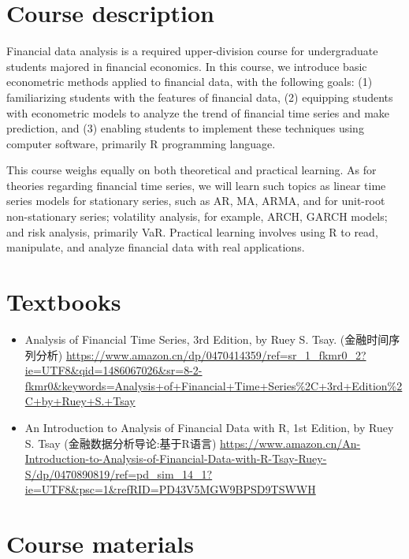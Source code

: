 \documentclass[11pt]{article}
\begin{document}
\section{Course description}
\label{sec:org98694b7}

Financial data analysis is a required upper-division course for
undergraduate students majored in financial economics. In this course,
we introduce basic econometric methods applied to financial data, with
the following goals: (1) familiarizing students with the features of
financial data, (2) equipping students with econometric models to
analyze the trend of financial time series and make prediction, and
(3) enabling students to implement these techniques using computer
software, primarily R programming language.

This course weighs equally on both theoretical and practical
learning. As for theories regarding financial time series, we will
learn such topics as linear time series models for stationary series,
such as AR, MA, ARMA, and for unit-root non-stationary series;
volatility analysis, for example, ARCH, GARCH models; and risk
analysis, primarily VaR. Practical learning involves using R to read,
manipulate, and analyze financial data with real applications.


\section{Textbooks}
\label{sec:org1898856}

\begin{itemize}
\item Analysis of Financial Time Series, 3rd Edition, by Ruey S. Tsay.
(金融时间序列分析)
\url{https://www.amazon.cn/dp/0470414359/ref=sr\_1\_fkmr0\_2?ie=UTF8\&qid=1486067026\&sr=8-2-fkmr0\&keywords=Analysis+of+Financial+Time+Series\%2C+3rd+Edition\%2C+by+Ruey+S.+Tsay}

\item An Introduction to Analysis of Financial Data with R, 1st Edition,
by Ruey S. Tsay (金融数据分析导论:基于R语言) \url{https://www.amazon.cn/An-Introduction-to-Analysis-of-Financial-Data-with-R-Tsay-Ruey-S/dp/0470890819/ref=pd\_sim\_14\_1?ie=UTF8\&psc=1\&refRID=PD43V5MGW9BPSD9TSWWH}
\end{itemize}


\section{Course materials}
\label{sec:org00fdefc}
\end{document}
